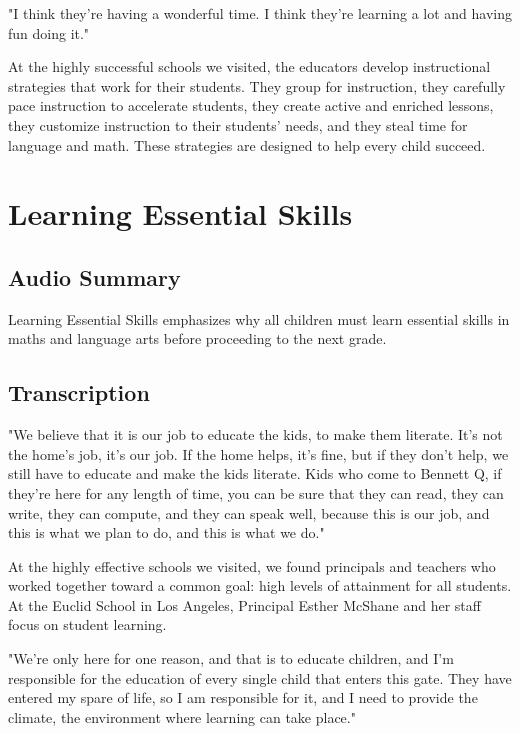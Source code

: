 "I think they're having a wonderful time. I think they're learning a lot and having fun doing it."

At the highly successful schools we visited, the educators develop instructional strategies that work for their students. They group for instruction, they carefully pace instruction to accelerate students, they create active and enriched lessons, they customize instruction to their students' needs, and they steal time for language and math. These strategies are designed to help every child succeed.

\section{Learning Essential Skills}

\subsection{Audio Summary}

Learning Essential Skills emphasizes why all children must learn essential skills in maths and language arts before proceeding to the next grade.

\subsection{Transcription}

"We believe that it is our job to educate the kids, to make them literate. It's not the home's job, it's our job. If the home helps, it's fine, but if they don't help, we still have to educate and make the kids literate. Kids who come to Bennett Q, if they're here for any length of time, you can be sure that they can read, they can write, they can compute, and they can speak well, because this is our job, and this is what we plan to do, and this is what we do."

At the highly effective schools we visited, we found principals and teachers who worked together toward a common goal: high levels of attainment for all students. At the Euclid School in Los Angeles, Principal Esther McShane and her staff focus on student learning.

"We're only here for one reason, and that is to educate children, and I'm responsible for the education of every single child that enters this gate. They have entered my spare of life, so I am responsible for it, and I need to provide the climate, the environment where learning can take place."

